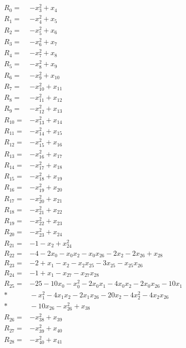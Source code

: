 \begingroup\small
\allowdisplaybreaks[4]
\setlength{\jot}{2pt}
\begin{align*}
R_{0}={}&-x_{3}^{2}+x_{4}\\[3pt]
R_{1}={}&-x_{4}^{2}+x_{5}\\[3pt]
R_{2}={}&-x_{5}^{2}+x_{6}\\[3pt]
R_{3}={}&-x_{6}^{2}+x_{7}\\[3pt]
R_{4}={}&-x_{7}^{2}+x_{8}\\[3pt]
R_{5}={}&-x_{8}^{2}+x_{9}\\[3pt]
R_{6}={}&-x_{9}^{2}+x_{10}\\[3pt]
R_{7}={}&-x_{10}^{2}+x_{11}\\[3pt]
R_{8}={}&-x_{11}^{2}+x_{12}\\[3pt]
R_{9}={}&-x_{12}^{2}+x_{13}\\[3pt]
R_{10}={}&-x_{13}^{2}+x_{14}\\[3pt]
R_{11}={}&-x_{14}^{2}+x_{15}\\[3pt]
R_{12}={}&-x_{15}^{2}+x_{16}\\[3pt]
R_{13}={}&-x_{16}^{2}+x_{17}\\[3pt]
R_{14}={}&-x_{17}^{2}+x_{18}\\[3pt]
R_{15}={}&-x_{18}^{2}+x_{19}\\[3pt]
R_{16}={}&-x_{19}^{2}+x_{20}\\[3pt]
R_{17}={}&-x_{20}^{2}+x_{21}\\[3pt]
R_{18}={}&-x_{21}^{2}+x_{22}\\[3pt]
R_{19}={}&-x_{22}^{2}+x_{23}\\[3pt]
R_{20}={}&-x_{23}^{2}+x_{24}\\[3pt]
R_{21}={}&-1-x_{2}+x_{24}^{2}\\[3pt]
R_{22}={}&-4-2x_{0}-x_{0}x_{2}-x_{0}x_{26}-2x_{2}-2x_{26}+x_{28}\\[3pt]
R_{23}={}&-2+x_{1}-x_{2}-x_{2}x_{25}-3x_{25}-x_{25}x_{26}\\[3pt]
R_{24}={}&-1+x_{1}-x_{27}-x_{27}x_{28}\\[3pt]
R_{25}={}&-25-10x_{0}-x_{0}^{2}-2x_{0}x_{1}-4x_{0}x_{2}-2x_{0}x_{26}-10x_{1}\\*
&{}-x_{1}^{2}-4x_{1}x_{2}-2x_{1}x_{26}-20x_{2}-4x_{2}^{2}-4x_{2}x_{26}\\*
&{}-10x_{26}-x_{26}^{2}+x_{38}\\[3pt]
R_{26}={}&-x_{38}^{2}+x_{39}\\[3pt]
R_{27}={}&-x_{39}^{2}+x_{40}\\[3pt]
R_{28}={}&-x_{40}^{2}+x_{41}\\[3pt]

\end{align*}
